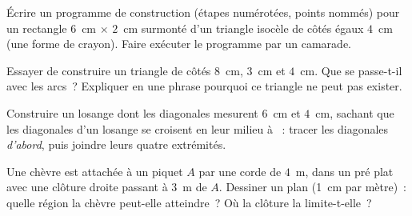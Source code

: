 \begin{exercise}[$\star$]\label{exo:g5:geometry:8}
Écrire un programme de construction (étapes numérotées, points
nommés) pour un rectangle $6$~cm $\times$ $2$~cm surmonté d'un
triangle isocèle de côtés égaux $4$~cm (une forme de crayon). Faire
exécuter le programme par un camarade.
\end{exercise}

\begin{exercise}[$\star\star$]\label{exo:g5:geometry:9}
Essayer de construire un triangle de côtés $8$~cm, $3$~cm et
$4$~cm. Que se passe-t-il avec les arcs~? Expliquer en une phrase
pourquoi ce triangle ne peut pas exister.
\end{exercise}

\begin{exercise}[$\star\star$]\label{exo:g5:geometry:10}
Construire un losange dont les diagonales mesurent $6$~cm et
$4$~cm, sachant que les diagonales d'un losange se croisent en leur
milieu à ~: tracer les diagonales \emph{d'abord}, puis
joindre leurs quatre extrémités.
\end{exercise}

\begin{exercise}[$\star\star$]\label{exo:g5:geometry:11}
Une chèvre est attachée à un piquet $A$ par une corde de $4$~m,
dans un pré plat avec une clôture droite passant à $3$~m de $A$.
Dessiner un plan (1~cm par mètre)~: quelle région la chèvre peut-elle
atteindre~? Où la clôture la limite-t-elle~?
\end{exercise}
